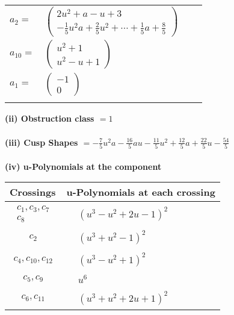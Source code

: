 \documentclass[1p]{elsarticle_modified}
\theoremstyle{definition}
\begin{document}
\begin{tabular}{m{7pt} m{180pt} m{7pt} m{180pt} }
\flushright $a_{2}=$&$\begin{pmatrix}2 u^2+a- u+3\\-\frac{1}{5} u^2 a+\frac{2}{5} u^2+\cdots+\frac{1}{5} a+\frac{8}{5}\end{pmatrix}$ \\
\flushright $a_{10}=$&$\begin{pmatrix}u^2+1\\u^2- u+1\end{pmatrix}$ \\
\flushright $a_{1}=$&$\begin{pmatrix}-1\\0\end{pmatrix}$\\&\end{tabular}
\flushleft \textbf{(ii) Obstruction class $= 1$}\\~\\
\flushleft \textbf{(iii) Cusp Shapes $= -\frac{7}{5} u^2 a-\frac{16}{5} a u-\frac{11}{5} u^2+\frac{12}{5} a+\frac{22}{5} u-\frac{54}{5}$}\\~\\
\newpage\renewcommand{\arraystretch}{1}
\flushleft \textbf{(iv) u-Polynomials at the component}\newline \\
\begin{tabular}{m{50pt}|m{274pt}}
Crossings & \hspace{64pt}u-Polynomials at each crossing \\
\hline $$\begin{aligned}c_{1},c_{3},c_{7}\\c_{8}\end{aligned}$$&$\begin{aligned}
&(u^3- u^2+2 u-1)^2
\end{aligned}$\\
\hline $$\begin{aligned}c_{2}\end{aligned}$$&$\begin{aligned}
&(u^3+u^2-1)^2
\end{aligned}$\\
\hline $$\begin{aligned}c_{4},c_{10},c_{12}\end{aligned}$$&$\begin{aligned}
&(u^3- u^2+1)^2
\end{aligned}$\\
\hline $$\begin{aligned}c_{5},c_{9}\end{aligned}$$&$\begin{aligned}
&u^6
\end{aligned}$\\
\hline $$\begin{aligned}c_{6},c_{11}\end{aligned}$$&$\begin{aligned}
&(u^3+u^2+2 u+1)^2
\end{aligned}$\\
\hline
\end{tabular}\\~\\
\end{document}
